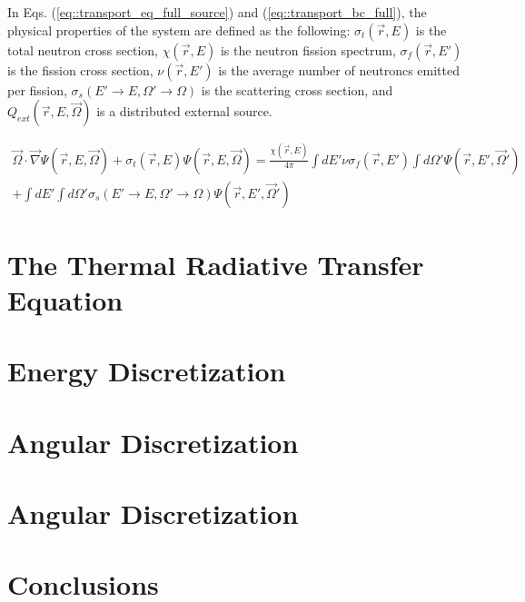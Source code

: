 \noindent In Eqs. (\ref{eq::transport_eq_full_source}) and (\ref{eq::transport_bc_full}), the physical properties of the system are defined as the following: $\sigma_t (\vec{r}, E)$ is the total neutron cross section, $\chi (\vec{r}, E)$ is the neutron fission spectrum, $\sigma_f (\vec{r}, E')$ is the fission cross section, $\nu (\vec{r}, E')$ is the average number of neutroncs emitted per fission, $\sigma_s (E' \rightarrow E, \Omega' \rightarrow \Omega)$ is the scattering cross section, and $Q_{ext} (\vec{r}, E, \vec{\Omega})$ is a distributed external source.


\begin{equation}
\label{eq::transport_eq_full_keff}
\begin{aligned}
	\vec{\Omega} \cdot \vec{\nabla} \Psi (\vec{r}, E, \vec{\Omega})+ \sigma_t (\vec{r}, E) \Psi (\vec{r}, E, \vec{\Omega}) = \frac{\chi (\vec{r}, E)}{4 \pi} \int dE' \nu \sigma_f (\vec{r}, E') \int d\Omega' \Psi (\vec{r}, E', \vec{\Omega}') \\ 
	+ \int dE' \int d\Omega' \sigma_s (E' \rightarrow E, \Omega' \rightarrow \Omega) \Psi (\vec{r}, E', \vec{\Omega}') 
\end{aligned}
\end{equation}

\section{The Thermal Radiative Transfer Equation}
\label{sec::Sn_TRT}

\section{Energy Discretization}
\label{sec::Sn_MG}

\section{Angular Discretization}
\label{sec::Sn_Angle}

\section{Angular Discretization}
\label{sec::Sn_Full}


\section{Conclusions}
\label{sec::Sn_Conclusions}
